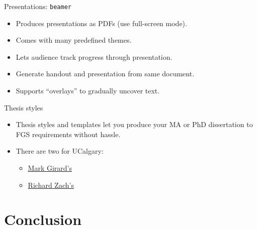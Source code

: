 \begin{frame}{Presentations: \texttt{beamer}}

\begin{itemize}[<+->]
\item Produces presentations as PDFs (use full-screen mode).
\item Comes with many predefined themes.
\item Lets audience track progress through presentation.
\item Generate handout and presentation from same document.
\item Supports ``overlays'' to gradually uncover text.
\end{itemize}

\end{frame}

\begin{frame}{Thesis styles}

\begin{itemize}
  \item Thesis styles and templates let you produce your MA or PhD
  dissertation to FGS requirements without hassle.
  \item There are two for UCalgary:
  \begin{itemize}
    \item \href{https://github.com/markwgirard/ucalgarythesis}{Mark Girard's}
    \item \href{https://github.com/rzach/ucalgmthesis}{Richard Zach's}
  \end{itemize}
\end{itemize}
\end{frame}

\section{Conclusion}

